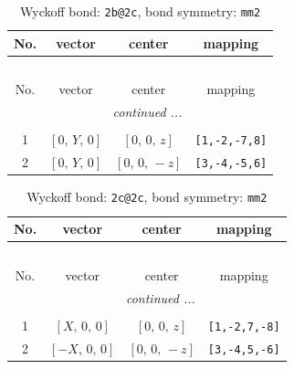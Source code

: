 \documentclass[fleqn,8pt]{jsarticle}
\begin{document}
\renewcommand{\arraystretch}{1.2}
\begin{longtable}{cccc}
\caption{Wyckoff bond: {\tt 2b@2c}, bond symmetry: {\tt mm2}}
 \\
 \hline \hline
No. & vector & center & mapping \\ \hline \endfirsthead

\multicolumn{3}{l}{\tablename\ \thetable{}} \\
 \hline \hline
No. & vector & center & mapping \\ \hline \endhead

 \hline \hline
\multicolumn{3}{r}{\footnotesize\it continued ...} \\ \endfoot

 \hline \hline
\multicolumn{3}{r}{} \\ \endlastfoot

1 & $\left[ 0,\, Y,\, 0 \right]$ & $\left[ 0,\, 0,\, z \right]$ & {\tt [1,-2,-7,8]} \\ \hline
2 & $\left[ 0,\, Y,\, 0 \right]$ & $\left[ 0,\, 0,\, - z \right]$ & {\tt [3,-4,-5,6]} \\
\end{longtable}
\renewcommand{\arraystretch}{1.2}
\begin{longtable}{cccc}
\caption{Wyckoff bond: {\tt 2c@2c}, bond symmetry: {\tt mm2}}
 \\
 \hline \hline
No. & vector & center & mapping \\ \hline \endfirsthead

\multicolumn{3}{l}{\tablename\ \thetable{}} \\
 \hline \hline
No. & vector & center & mapping \\ \hline \endhead

 \hline \hline
\multicolumn{3}{r}{\footnotesize\it continued ...} \\ \endfoot

 \hline \hline
\multicolumn{3}{r}{} \\ \endlastfoot

1 & $\left[ X,\, 0,\, 0 \right]$ & $\left[ 0,\, 0,\, z \right]$ & {\tt [1,-2,7,-8]} \\ \hline
2 & $\left[ - X,\, 0,\, 0 \right]$ & $\left[ 0,\, 0,\, - z \right]$ & {\tt [3,-4,5,-6]} \\
\end{longtable}
\renewcommand{\arraystretch}{1.2}
\end{document}
